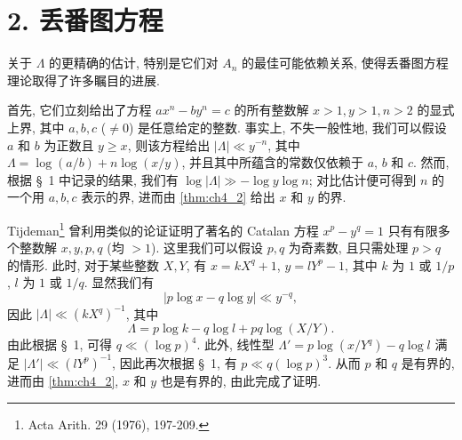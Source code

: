 \section*{2. 丢番图方程}

关于 \(\Lambda\) 的更精确的估计, 特别是它们对 \(A_n\) 的最佳可能依赖关系, 使得丢番图方程理论取得了许多瞩目的进展.

首先, 它们立刻给出了方程 \(ax^n-by^n=c\) 的所有整数解 \(x>1, y>1, n>2\) 的显式上界, 其中 \(a, b, c\) (\(\neq 0\)) 是任意给定的整数. 事实上, 不失一般性地, 我们可以假设 \(a\) 和 \(b\) 为正数且 \(y\ge x\), 则该方程给出 \(|\Lambda|\ll y^{-n}\), 其中 \(\Lambda=\log{(a/b)}+n\log{(x/y)}\), 并且其中所蕴含的常数仅依赖于 \(a\), \(b\) 和 \(c\). 然而, 根据 \S~1 中记录的结果, 我们有 \(\log{|\Lambda|} \gg -\log{y}\log{n}\); 对比估计便可得到 \(n\) 的一个用 \(a, b, c\) 表示的界, 进而由 \autoref{thm:ch4_2} 给出 \(x\) 和 \(y\) 的界.

Tijdeman\footnote{Acta Arith. 29 (1976), 197-209.} 曾利用类似的论证证明了著名的 Catalan 方程 \(x^p - y^q = 1\) 只有有限多个整数解 \(x, y, p, q\) (均 \({}> 1\)). 这里我们可以假设 \(p, q\) 为奇素数, 且只需处理 \(p > q\) 的情形. 此时, 对于某些整数 \(X, Y\), 有 \(x = kX^q + 1\), \(y = lY^p - 1\), 其中 \(k\) 为 \(1\) 或 \(1/p\), \(l\) 为 \(1\) 或 \(1/q\). 显然我们有
\[ |p\log x - q\log y| \ll y^{-q}, \]
因此 \(|\Lambda| \ll (kX^q)^{-1}\), 其中
\[ \Lambda = p \log k - q \log l + pq \log (X/Y). \]
由此根据 \S~1, 可得 \(q \ll (\log p)^4\). 此外, 线性型 \(\Lambda' = p \log (x/Y^q) - q \log l\) 满足 \(|\Lambda'| \ll (lY^p)^{-1}\), 因此再次根据 \S~1, 有 \(p \ll q (\log p)^3\). 从而 \(p\) 和 \(q\) 是有界的, 进而由 \autoref{thm:ch4_2}, \(x\) 和 \(y\) 也是有界的, 由此完成了证明.

